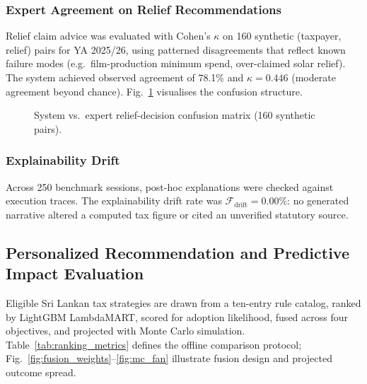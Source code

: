 \documentclass[conference]{IEEEtran}
\begin{document}
\subsubsection{Expert Agreement on Relief Recommendations}
Relief claim advice was evaluated with Cohen's $\kappa$ on 160 synthetic (taxpayer, relief) pairs for YA 2025/26, using patterned disagreements that reflect known failure modes (e.g.\ film-production minimum spend, over-claimed solar relief). The system achieved observed agreement of 78.1\% and $\kappa = 0.446$ (moderate agreement beyond chance). Fig.~\ref{fig:kappa_confusion} visualises the confusion structure.

\begin{figure}[!htbp]
\centering
{}
\caption{System vs.\ expert relief-decision confusion matrix (160 synthetic pairs).}
\label{fig:kappa_confusion}
\end{figure}

\subsubsection{Explainability Drift}
Across 250 benchmark sessions, post-hoc explanations were checked against execution traces. The explainability drift rate was $\mathcal{F}_{\text{drift}} = 0.00\%$: no generated narrative altered a computed tax figure or cited an unverified statutory source.

\subsection{Personalized Recommendation and Predictive Impact Evaluation}
Eligible Sri Lankan tax strategies are drawn from a ten-entry rule catalog, ranked by LightGBM LambdaMART, scored for adoption likelihood, fused across four objectives, and projected with Monte Carlo simulation. Table~\ref{tab:ranking_metrics} defines the offline comparison protocol; Fig.~\ref{fig:fusion_weights}--\ref{fig:mc_fan} illustrate fusion design and projected outcome spread.
\end{document}
